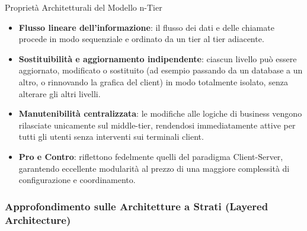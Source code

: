 \documentclass[12pt]{extarticle}
\begin{document}
\begin{cbox}{Proprietà Architetturali del Modello n-Tier}
\begin{itemize}
    \item \textbf{Flusso lineare dell'informazione}: il flusso dei dati e delle chiamate procede in modo sequenziale e ordinato da un tier al tier adiacente.
    \item \textbf{Sostituibilità e aggiornamento indipendente}: ciascun livello può essere aggiornato, modificato o sostituito (ad esempio passando da un database a un altro, o rinnovando la grafica del client) in modo totalmente isolato, senza alterare gli altri livelli.
    \item \textbf{Manutenibilità centralizzata}: le modifiche alle logiche di business vengono rilasciate unicamente sul middle-tier, rendendosi immediatamente attive per tutti gli utenti senza interventi sui terminali client.
    \item \textbf{Pro e Contro}: riflettono fedelmente quelli del paradigma Client-Server, garantendo eccellente modularità al prezzo di una maggiore complessità di configurazione e coordinamento.
\end{itemize}
\end{cbox}


\subsubsection{Approfondimento sulle Architetture a Strati (Layered Architecture)}
\end{document}
